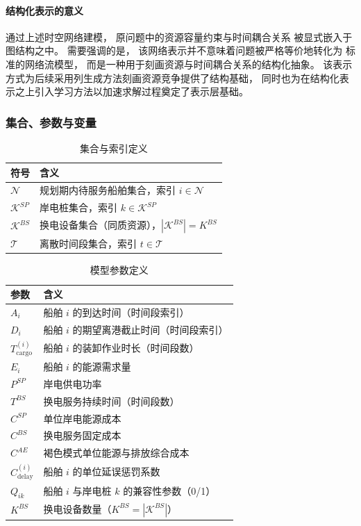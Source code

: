 \documentclass[UTF8, a4paper, 12pt]{ctexart}
\begin{document}
\paragraph{结构化表示的意义}
通过上述时空网络建模，
原问题中的资源容量约束与时间耦合关系
被显式嵌入于图结构之中。
需要强调的是，
该网络表示并不意味着问题被严格等价地转化为
标准的网络流模型，
而是一种用于刻画资源与时间耦合关系的结构化抽象。
该表示方式为后续采用列生成方法刻画资源竞争提供了结构基础，
同时也为在结构化表示之上引入学习方法以加速求解过程奠定了表示层基础。



\subsubsection{集合、参数与变量}

\begin{table}[p]
\centering
\caption{集合与索引定义}
\begin{tabular}{ll}
\toprule
符号 & 含义 \\
\midrule
$\mathcal{N}$ & 规划期内待服务船舶集合，索引 $i \in \mathcal{N}$ \\
$\mathcal{K}^{SP}$ & 岸电桩集合，索引 $k \in \mathcal{K}^{SP}$ \\
$\mathcal{K}^{BS}$ & 换电设备集合（同质资源），$|\mathcal{K}^{BS}| = K^{BS}$ \\
$\mathcal{T}$ & 离散时间段集合，索引 $t \in \mathcal{T}$ \\
\bottomrule
\end{tabular}
\end{table}


\begin{table}[htbp]
\centering
\caption{模型参数定义}
\begin{tabular}{ll}
\toprule
参数 & 含义 \\
\midrule
$A_i$ & 船舶 $i$ 的到达时间（时间段索引） \\
$D_i$ & 船舶 $i$ 的期望离港截止时间（时间段索引） \\
$T^{(i)}_{\text{cargo}}$ & 船舶 $i$ 的装卸作业时长（时间段数） \\
$E_i$ & 船舶 $i$ 的能源需求量 \\
$P^{SP}$ & 岸电供电功率 \\
$T^{BS}$ & 换电服务持续时间（时间段数） \\
$C^{SP}$ & 单位岸电能源成本 \\
$C^{BS}$ & 换电服务固定成本 \\
$C^{AE}$ & 褐色模式单位能源与排放综合成本 \\
$C^{(i)}_{\text{delay}}$ & 船舶 $i$ 的单位延误惩罚系数 \\
$Q_{ik}$ & 船舶 $i$ 与岸电桩 $k$ 的兼容性参数（0/1） \\
$K^{BS}$ & 换电设备数量（$K^{BS}=|\mathcal{K}^{BS}|$） \\
\bottomrule
\end{tabular}
\end{table}
\end{document}
